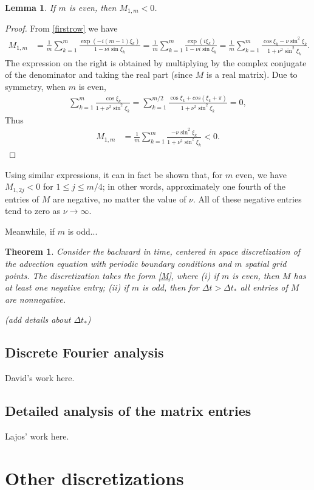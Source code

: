 \documentclass[a4paper]{article}
\newtheorem{theorem}{Theorem}
\newtheorem{lemma}{Lemma}
\newcommand{\dt}{\Delta t}
\begin{document}
\begin{lemma}
    If $m$ is even, then $M_{1,m} < 0$.
\end{lemma}
\begin{proof}
    From \eqref{firstrow} we have
    \begin{align}  \label{M12}
        M_{1,m} & = \frac{1}{m} \sum_{k=1}^m \frac{ \exp(-i(m-1)\xi_k)}{1-\nu i \sin\xi_k}
                  = \frac{1}{m} \sum_{k=1}^m \frac{ \exp(i\xi_k)}{1-\nu i \sin\xi_k}
                  = \frac{1}{m} \sum_{k=1}^m \frac{\cos \xi_k - \nu \sin^2 \xi_k}{1+\nu^2 \sin^2 \xi_k}.
    \end{align}
    The expression on the right is obtained by multiplying by the complex
    conjugate of the denominator and taking the real part (since $M$ is a real matrix).
    Due to symmetry, when $m$ is even,
    \begin{align*}
        \sum_{k=1}^m \frac{\cos \xi_k}{1+\nu^2\sin^2\xi_k}  = \sum_{k=1}^{m/2} \frac{\cos \xi_k + cos(\xi_k+\pi)}{1+\nu^2\sin^2\xi_k} = 0,
    \end{align*}
    Thus 
    \begin{align*} 
        M_{1,m} & = \frac{1}{m} \sum_{k=1}^m \frac{- \nu \sin^2 \xi_k}{1+\nu^2 \sin^2 \xi_k} < 0.
    \end{align*}
\end{proof}
Using similar expressions, it can in fact be shown that, for $m$ even, we have
$M_{1,2j}<0$ for $1\le j \le m/4$; in other words, approximately one fourth of
the entries of $M$ are negative, no matter the value of $\nu$.  All of these
negative entries tend to zero as $\nu \to \infty$.

Meanwhile, if $m$ is odd...

\begin{theorem}
Consider the backward in time, centered in space discretization of the
advection equation with periodic boundary conditions and $m$ spatial grid
points.  The discretization takes the form \eqref{M},
where (i) if $m$ is even, then $M$ has at least one negative entry;
(ii) if $m$ is odd, then for $\dt>\dt_*$ all entries of $M$ are nonnegative.

(add details about $\dt_*$)
\end{theorem}

\subsection{Discrete Fourier analysis}
David's work here.

\subsection{Detailed analysis of the matrix entries}
Lajos' work here.

\section{Other discretizations}
\end{document}
